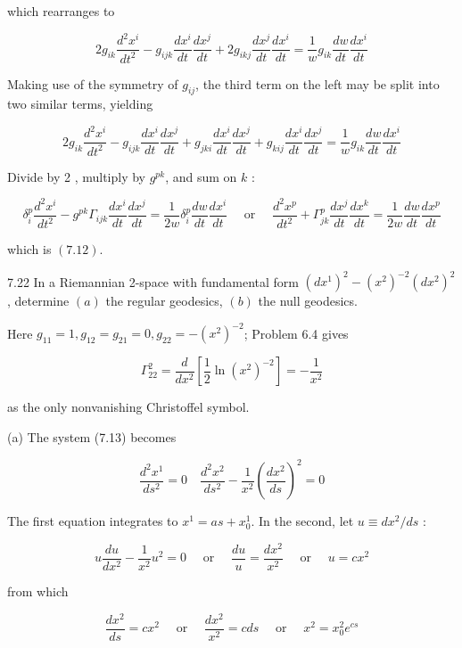 \documentclass[10pt]{article}
\begin{document}
which rearranges to

$$
2 g_{i k} \frac{d^{2} x^{i}}{d t^{2}}-g_{i j k} \frac{d x^{i}}{d t} \frac{d x^{j}}{d t}+2 g_{i k j} \frac{d x^{j}}{d t} \frac{d x^{i}}{d t}=\frac{1}{w} g_{i k} \frac{d w}{d t} \frac{d x^{i}}{d t}
$$

Making use of the symmetry of $g_{i j}$, the third term on the left may be split into two similar terms, yielding

$$
2 g_{i k} \frac{d^{2} x^{i}}{d t^{2}}-g_{i j k} \frac{d x^{i}}{d t} \frac{d x^{j}}{d t}+g_{j k i} \frac{d x^{i}}{d t} \frac{d x^{j}}{d t}+g_{k i j} \frac{d x^{i}}{d t} \frac{d x^{j}}{d t}=\frac{1}{w} g_{i k} \frac{d w}{d t} \frac{d x^{i}}{d t}
$$

Divide by 2 , multiply by $g^{p k}$, and sum on $k$ :

$$
\delta_{i}^{p} \frac{d^{2} x^{i}}{d t^{2}}-g^{p k} \Gamma_{i j k} \frac{d x^{i}}{d t} \frac{d x^{j}}{d t}=\frac{1}{2 w} \delta_{i}^{p} \frac{d w}{d t} \frac{d x^{i}}{d t} \quad \text { or } \quad \frac{d^{2} x^{p}}{d t^{2}}+\Gamma_{j k}^{p} \frac{d x^{j}}{d t} \frac{d x^{k}}{d t}=\frac{1}{2 w} \frac{d w}{d t} \frac{d x^{p}}{d t}
$$

which is $(7.12)$.

7.22 In a Riemannian 2-space with fundamental form $\left(d x^{1}\right)^{2}-\left(x^{2}\right)^{-2}\left(d x^{2}\right)^{2}$, determine $(a)$ the regular geodesics, $(b)$ the null geodesics.

Here $g_{11}=1, g_{12}=g_{21}=0, g_{22}=-\left(x^{2}\right)^{-2}$; Problem 6.4 gives

$$
\Gamma_{22}^{2}=\frac{d}{d x^{2}}\left[\frac{1}{2} \ln \left(x^{2}\right)^{-2}\right]=-\frac{1}{x^{2}}
$$

as the only nonvanishing Christoffel symbol.

(a) The system (7.13) becomes

$$
\frac{d^{2} x^{1}}{d s^{2}}=0 \quad \frac{d^{2} x^{2}}{d s^{2}}-\frac{1}{x^{2}}\left(\frac{d x^{2}}{d s}\right)^{2}=0
$$

The first equation integrates to $x^{1}=a s+x_{0}^{1}$. In the second, let $u \equiv d x^{2} / d s$ :

$$
u \frac{d u}{d x^{2}}-\frac{1}{x^{2}} u^{2}=0 \quad \text { or } \quad \frac{d u}{u}=\frac{d x^{2}}{x^{2}} \quad \text { or } \quad u=c x^{2}
$$

from which

$$
\frac{d x^{2}}{d s}=c x^{2} \quad \text { or } \quad \frac{d x^{2}}{x^{2}}=c d s \quad \text { or } \quad x^{2}=x_{0}^{2} e^{c s}
$$
\end{document}
